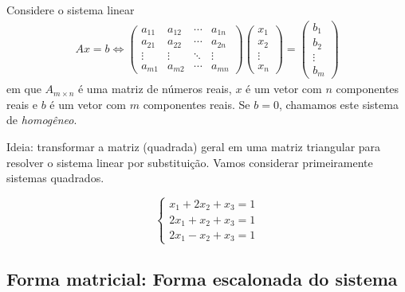 Considere o sistema linear
\begin{align*}
    Ax=b \Leftrightarrow 
        \begin{pmatrix}
            a_{11} & a_{12} & \cdots & a_{1n}\\
            a_{21} & a_{22} & \cdots & a_{2n}\\
            \vdots & \vdots & \ddots & \vdots\\
            a_{m1} & a_{m2} & \cdots & a_{mn}
        \end{pmatrix}
        \begin{pmatrix}
            x_1\\
            x_2\\
            \vdots\\
            x_n
        \end{pmatrix}
        =
        \begin{pmatrix}
            b_1\\
            b_2\\
            \vdots\\
            b_m
        \end{pmatrix}
\end{align*}
em que $A_{m\times n}$ é uma matriz de números reais, $x$ é um vetor com $n$ componentes reais e $b$ é um vetor com $m$ componentes reais. Se $b = 0$, chamamos este sistema de \emph{homogêneo}.

Ideia: transformar a matriz (quadrada) geral em uma matriz triangular para resolver o sistema linear por substituição. Vamos considerar primeiramente sistemas quadrados.

\begin{exemplo*}
\begin{equation*}
	\begin{cases}
		x_1 + 2x_2 + x_3 = 1\\
		2x_1 + x_2 + x_3 = 1\\
		2x_1 - x_2 + x_3 = 1
    \end{cases}
\end{equation*}
\end{exemplo*}

\subsection{Forma matricial: Forma escalonada do sistema}

